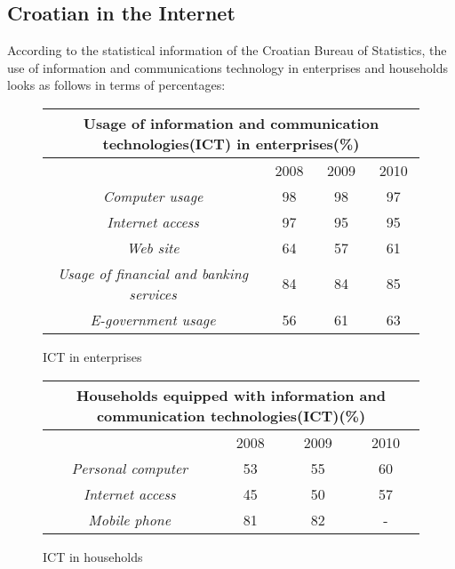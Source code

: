 \begin{multicols}{2}
\subsection{Croatian in the Internet}

According to the statistical information of the Croatian Bureau of Statistics, the use of information and communications technology in enterprises and households looks as follows in terms of percentages:

\begin{figure*}[htb]
\centering
    \begin{tabular}{|c|c|c|c|}
        \hline
      \multicolumn{4}{|c|}{\textbf{Usage of information and communication technologies(ICT) in enterprises(\%)}} \\ \hline
        ~                                              & 2008 & 2009 & 2010 \\ \hline
        \emph{Computer usage}                        & 98   & 98   & 97   \\ \hline
        \emph{Internet access}                       & 97   & 95   & 95   \\ \hline
        \emph{Web site}                            & 64   & 57   & 61   \\ \hline
        \emph{Usage of financial and banking services} & 84   & 84   & 85   \\ \hline
        \emph{E-government usage}                 & 56   & 61   & 63   \\
        \hline
   \end{tabular}
  \caption{ICT in enterprises}
  \label{fig:IST_pod_en}
\end{figure*}

\begin{figure*}[htb]
\centering
	\begin{tabular}{|c|c|c|c|}
        \hline
      \multicolumn{4}{|c|}{\textbf{Households equipped with information and communication technologies(ICT)(\%)}} \\ \hline
        ~                                              & 2008 & 2009 & 2010 \\ \hline
        \emph{Personal computer}   & 53   & 55   & 60   \\ \hline
        \emph{Internet access} & 45   & 50   & 57   \\ \hline
        \emph{Mobile phone}   & 81   & 82   & -    \\
        \hline
   \end{tabular}
  \caption{ICT in households}
  \label{fig:IST_kuc_en}
\end{figure*}


\end{multicols}
